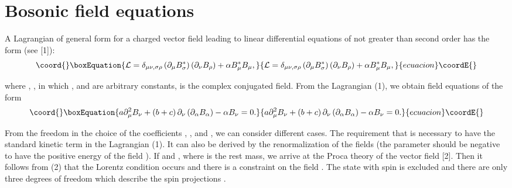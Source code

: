 \documentclass[a4paper,12pt]{article}
\begin{document}
\section{Bosonic field equations}

A Lagrangian of general form for a charged vector field leading to
linear differential equations of not greater than second order has
the form (see [1]):
\begin{equation}\coord{}\boxEquation{
\mathcal{L}=\delta _{\mu \nu ,\sigma \rho }\left( \partial _\mu
B^*_\sigma \right) \left( \partial _\nu B_\rho \right) +\alpha
B^*_\mu B_\mu,  \label{1}
}{
\mathcal{L}=\delta _{\mu \nu ,\sigma \rho }\left( \partial _\mu
B^*_\sigma \right) \left( \partial _\nu B_\rho \right) +\alpha
B^*_\mu B_\mu,  }{ecuacion}\coordE{}\end{equation}

where \coordHE{}, \coordHE{}, in which \coordHE{} , \coordHE{} and \coordHE{} are arbitrary
constants, \coordHE{} is the complex conjugated field. From the
Lagrangian (1), we obtain field equations of the form
\begin{equation}\coord{}\boxEquation{
a\partial _\mu ^2B_\nu +\left( b+c\right) \partial _\nu \left(
\partial _\alpha B_\alpha \right) -\alpha B_\nu =0.  \label{2}
}{
a\partial _\mu ^2B_\nu +\left( b+c\right) \partial _\nu \left(
\partial _\alpha B_\alpha \right) -\alpha B_\nu =0.  }{ecuacion}\coordE{}\end{equation}

From the freedom in the choice of the coefficients \coordHE{}, \coordHE{}, and
\coordHE{}, we can consider different cases. The requirement that \coordHE{}
is necessary to have the standard kinetic term in the Lagrangian
(1). It can also be derived by the renormalization of the fields
\coordHE{} (the parameter \coordHE{} should be
negative to have the positive energy of the field \coordHE{} ). If
\coordHE{} and \coordHE{}, where \coordHE{} is the rest mass, we arrive
at the Proca theory of the vector field [2]. Then it follows from
(2) that the Lorentz condition \coordHE{}
occurs and there is a constraint on the field \coordHE{}. The state
with spin \coordHE{} is excluded and there are only three degrees of
freedom which describe the spin projections \coordHE{}  \coordHE{}.
\end{document}
